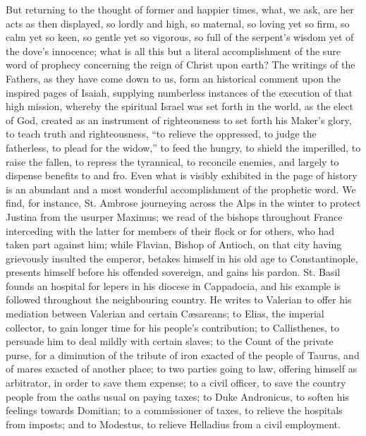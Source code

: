 But returning to the thought of former and happier times, what, we
ask, are her acts as then displayed, so lordly and high, so maternal,
so loving yet so firm, so calm yet so keen, so gentle yet so vigorous,
so full of the serpent's wisdom yet of the dove's innocence; what is
all this but a literal accomplishment of the sure word of prophecy
concerning the reign of Christ upon earth? The writings of the
Fathers, as they have come down to us, form an historical comment upon
the inspired pages of Isaiah, supplying numberless instances of the
execution of that high mission, whereby the spiritual Israel was set
forth in the world, as the elect of God, created as an instrument of
righteousness to set forth his Maker's glory, to teach truth and
righteousness, ``to relieve the oppressed, to judge the
fatherless, to plead for the widow,'' to feed the hungry, to
shield the imperilled, to raise the fallen, to repress the tyrannical,
to reconcile enemies, and largely to dispense benefits to and
fro. Even what is visibly exhibited in the page of history is an
abundant and a most wonderful accomplishment of the prophetic word. We
find, for instance, St. Ambrose journeying across the Alps in the
winter to protect Justina from the usurper Maximus; we read of the
bishops throughout France interceding with the latter for members of
their flock or for others, who had taken part against him; while
Flavian, Bishop of Antioch, on that city having grievously insulted
the emperor, betakes himself in his old age to Constantinople,
presents himself before his offended sovereign, and gains his pardon.
St. Basil founds an hospital for lepers in his diocese in Cappadocia,
and his example is followed throughout the neighbouring country. He
writes to Valerian to offer his mediation between Valerian and certain
Cæsareans; to Elias, the imperial collector, to gain longer time for
his people's contribution; to Callisthenes, to persuade him to deal
mildly with certain slaves; to the Count of the private purse, for a
diminution of the tribute of iron exacted of the people of Taurus, and
of mares exacted of another place; to two parties going to law,
offering himself as arbitrator, in order to save them expense; to a
civil officer, to save the country people from the oaths usual on
paying taxes; to Duke Andronicus, to soften his feelings towards
Domitian; to a commissioner of taxes, to relieve the hospitals from
imposts; and to Modestus, to relieve Helladius from a civil
employment.

